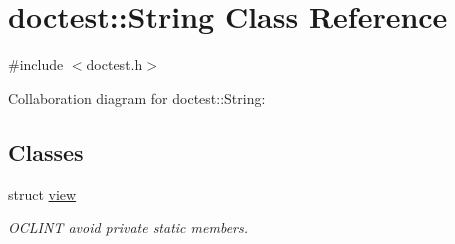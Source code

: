 \hypertarget{classdoctest_1_1String}{}\section{doctest\+:\+:String Class Reference}
\label{classdoctest_1_1String}


{\ttfamily \#include $<$doctest.\+h$>$}



Collaboration diagram for doctest\+:\+:String\+:
\subsection*{Classes}
\begin{DoxyCompactItemize}
\item 
struct \hyperlink{structdoctest_1_1String_1_1view}{view}
\begin{DoxyCompactList}\small\item\em O\+C\+L\+I\+NT avoid private static members. \end{DoxyCompactList}\end{DoxyCompactItemize}
